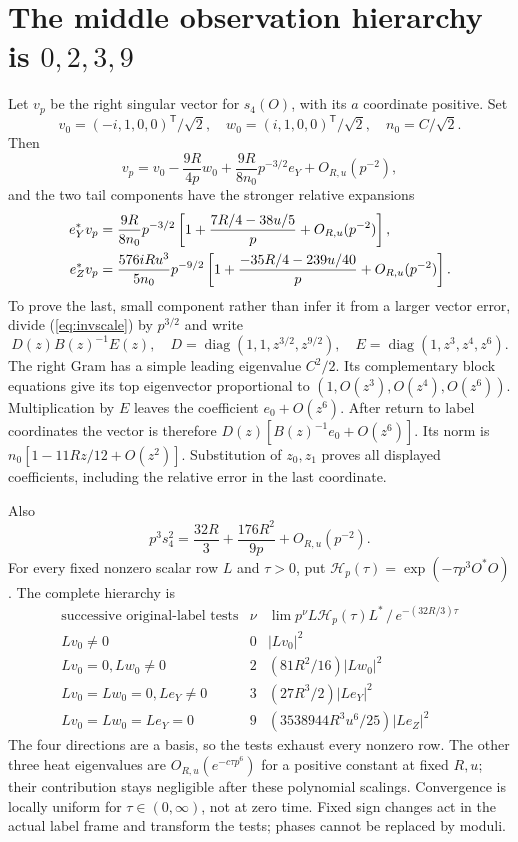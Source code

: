 \section{The middle observation hierarchy is \texorpdfstring{$0,2,3,9$}{0,2,3,9}}
Let $v_p$ be the right singular vector for $s_4(O)$, with its $a$ coordinate
positive. Set
\[
 v_0=(-i,1,0,0)^{\mathsf T}/\sqrt2,\quad
 w_0=(i,1,0,0)^{\mathsf T}/\sqrt2,\quad n_0=C/\sqrt2.
\]
Then
\[
 v_p=v_0-\frac{9R}{4p}w_0+
 \frac{9R}{8n_0}p^{-3/2}e_Y+O_{R,u}(p^{-2}),
\]
and the two tail components have the stronger relative expansions
\begin{align}
 e_Y^*v_p&=\frac{9R}{8n_0}p^{-3/2}
 \left[1+\frac{7R/4-38u/5}{p}+O_{R,u}(p^{-2})\right],\label{eq:tailsv}\\
 e_Z^*v_p&=\frac{576iRu^3}{5n_0}p^{-9/2}
 \left[1+\frac{-35R/4-239u/40}{p}+O_{R,u}(p^{-2})\right].\notag
\end{align}
To prove the last, small component rather than infer it from a larger vector
error, divide (\ref{eq:invscale}) by $p^{3/2}$ and write
\[
 D(z)B(z)^{-1}E(z),\quad
 D=\operatorname{diag}(1,1,z^{3/2},z^{9/2}),\quad
 E=\operatorname{diag}(1,z^3,z^4,z^6).
\]
The right Gram has a simple leading eigenvalue $C^2/2$. Its complementary
block equations give its top eigenvector proportional to
$(1,O(z^3),O(z^4),O(z^6))$. Multiplication by $E$ leaves the coefficient
$e_0+O(z^6)$. After return to label coordinates the vector is therefore
$D(z)[B(z)^{-1}e_0+O(z^6)]$. Its norm is
$n_0[1-11Rz/12+O(z^2)]$. Substitution of $z_0,z_1$ proves all displayed
coefficients, including the relative error in the last coordinate.

Also
\[
 p^3s_4^2=\frac{32R}{3}+\frac{176R^2}{9p}+O_{R,u}(p^{-2}).
\]
For every fixed nonzero scalar row $L$ and $\tau>0$, put
$\mathcal H_p(\tau)=\exp(-\tau p^3O^*O)$. The complete hierarchy is
\[
\begin{array}{c|c|c}
\text{successive original-label tests}&\nu&
 \lim p^\nu L\mathcal H_p(\tau)L^*\,/\,e^{-(32R/3)\tau}\\\hline
Lv_0\ne0&0&|Lv_0|^2\\
Lv_0=0,
Lw_0\ne0&2&(81R^2/16)|Lw_0|^2\\
Lv_0=Lw_0=0,
Le_Y\ne0&3&(27R^3/2)|Le_Y|^2\\
Lv_0=Lw_0=Le_Y=0&9&(3538944R^3u^6/25)|Le_Z|^2
\end{array}
\]
The four directions are a basis, so the tests exhaust every nonzero row.
The other three heat eigenvalues are $O_{R,u}(e^{-c\tau p^6})$ for a
positive constant at fixed $R,u$; their contribution stays negligible after
these polynomial scalings. Convergence is locally uniform for
$\tau\in(0,\infty)$, not at zero time. Fixed sign changes act in the actual
label frame and transform the tests; phases cannot be replaced by moduli.

